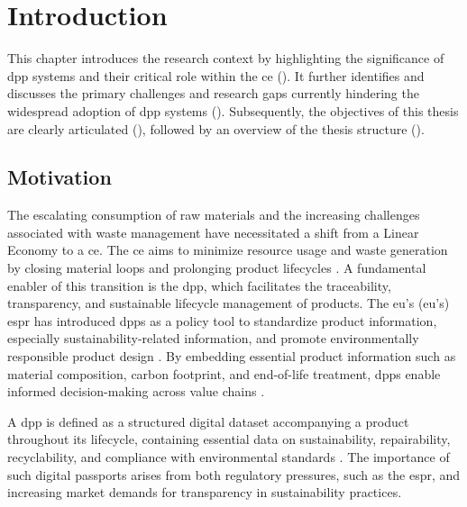 \chapter{Introduction}
\label{cha:chapter_1}

This chapter introduces the research context by highlighting the significance of \ac{dpp} systems and their critical role within the \ac{ce} (). It further identifies and discusses the primary challenges and research gaps currently hindering the widespread adoption of \ac{dpp} systems (). Subsequently, the objectives of this thesis are clearly articulated (), followed by an overview of the thesis structure ().


\section{Motivation}
\label{sec:motivation}

The escalating consumption of raw materials and the increasing challenges associated with waste management have necessitated a shift from a Linear Economy to a \acrlong{ce}. The \acrlong{ce} aims to minimize resource usage and waste generation by closing material loops and prolonging product lifecycles \autocite{EllenMacArthurFoundation.2015}. A fundamental enabler of this transition is the \acrlong{dpp}, which facilitates the traceability, transparency, and sustainable lifecycle management of products. The \acrlong{eu}'s (\acrshort{eu}'s) \ac{espr} has introduced \ac{dpp}s as a policy tool to standardize product information, especially sustainability-related information, and promote environmentally responsible product design \autocite{Garcia.2024}. By embedding essential product information such as material composition, carbon footprint, and end-of-life treatment, \ac{dpp}s enable informed decision-making across value chains \autocite{Psarommatis.2024}.

A \ac{dpp} is defined as a structured digital dataset accompanying a product throughout its lifecycle, containing essential data on sustainability, repairability, recyclability, and compliance with environmental standards . The importance of such digital passports arises from both regulatory pressures, such as the \ac{espr}, and increasing market demands for transparency in sustainability practices. \autocite{EuropeanParliamentandCouncil.2024}

